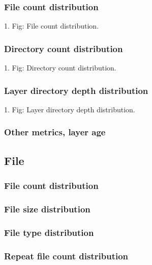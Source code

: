 \subsubsection{File count distribution}

1. Fig: File count distribution.

\subsubsection{Directory count distribution}

1. Fig: Directory count distribution.

\subsubsection{Layer directory depth distribution}

1. Fig: Layer directory depth distribution.

\subsubsection{Other metrics, layer age}

\subsection{File}

\subsubsection{File count distribution}

\subsubsection{File size distribution}

\subsubsection{File type distribution}

\subsubsection{Repeat file count distribution}
